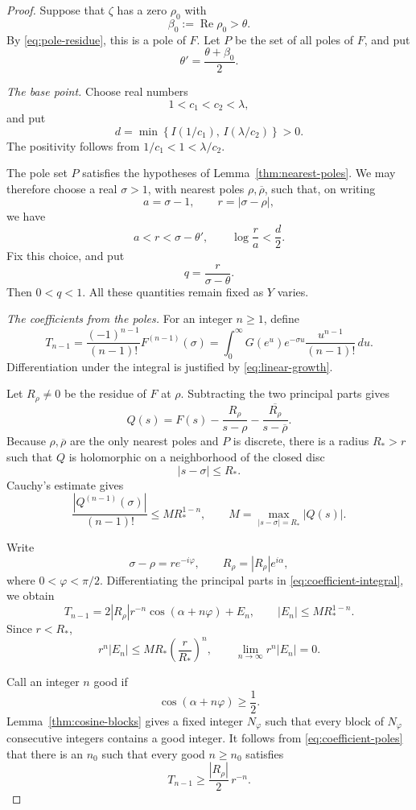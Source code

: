 \begin{proof}
Suppose that $\zeta$ has a zero $\rho_0$ with
\[
\beta_0:=\operatorname{Re}\rho_0>\theta.
\]
By \eqref{eq:pole-residue}, this is a pole of $F$. Let $P$ be the set of all poles of $F$, and put
\[
\theta'=\frac{\theta+\beta_0}{2}.
\]

\emph{The base point.} Choose real numbers
\[
1<c_1<c_2<\lambda,
\]
and put
\[
d=
\min\left\{
I(1/c_1),\,
I(\lambda/c_2)
\right\}>0.
\]
The positivity follows from $1/c_1<1<\lambda/c_2$.

The pole set $P$ satisfies the hypotheses of Lemma~\ref{thm:nearest-poles}. We may therefore choose a real $\sigma>1$, with nearest poles $\rho,\overline{\rho}$, such that, on writing
\[
a=\sigma-1,
\qquad
r=|\sigma-\rho|,
\]
we have
\[
a<r<\sigma-\theta',
\qquad
\log\frac ra<\frac d2.
\]
Fix this choice, and put
\[
q=\frac{r}{\sigma-\theta}.
\]
Then $0<q<1$. All these quantities remain fixed as $Y$ varies.

\emph{The coefficients from the poles.} For an integer $n\geq 1$, define
\begin{equation}\label{eq:coefficient-integral}
T_{n-1}
=
\frac{(-1)^{n-1}}{(n-1)!}F^{(n-1)}(\sigma)
=
\int_0^\infty
G(e^u)e^{-\sigma u}
\frac{u^{n-1}}{(n-1)!}\,du.
\end{equation}
Differentiation under the integral is justified by \eqref{eq:linear-growth}.

Let $R_\rho\ne 0$ be the residue of $F$ at $\rho$. Subtracting the two principal parts gives
\[
Q(s)
=
F(s)
-\frac{R_\rho}{s-\rho}
-\frac{\overline{R_\rho}}{s-\overline{\rho}}.
\]
Because $\rho,\overline{\rho}$ are the only nearest poles and $P$ is discrete, there is a radius $R_*>r$ such that $Q$ is holomorphic on a neighborhood of the closed disc
\[
|s-\sigma|\leq R_*.
\]
Cauchy's estimate gives
\[
\frac{|Q^{(n-1)}(\sigma)|}{(n-1)!}
\leq M R_*^{1-n},
\qquad
M=\max_{|s-\sigma|=R_*}|Q(s)|.
\]

Write
\[
\sigma-\rho=re^{-i\varphi},
\qquad
R_\rho=|R_\rho|e^{i\alpha},
\]
where $0<\varphi<\pi/2$. Differentiating the principal parts in \eqref{eq:coefficient-integral}, we obtain
\begin{equation}\label{eq:coefficient-poles}
T_{n-1}
=
2|R_\rho|r^{-n}\cos(\alpha+n\varphi)+E_n,
\qquad
|E_n|\leq M R_*^{1-n}.
\end{equation}
Since $r<R_*$,
\[
r^n|E_n|
\leq
M R_*\left(\frac{r}{R_*}\right)^n,
\qquad
\lim_{n\to\infty}r^n|E_n|=0.
\]

Call an integer $n$ good if
\[
\cos(\alpha+n\varphi)\geq \frac12.
\]
Lemma~\ref{thm:cosine-blocks} gives a fixed integer $N_\varphi$ such that every block of $N_\varphi$ consecutive integers contains a good integer. It follows from \eqref{eq:coefficient-poles} that there is an $n_0$ such that every good $n\geq n_0$ satisfies
\begin{equation}\label{eq:coefficient-lower-bound}
T_{n-1}
\geq
\frac{|R_\rho|}{2}\,r^{-n}.
\end{equation}


\end{proof}

